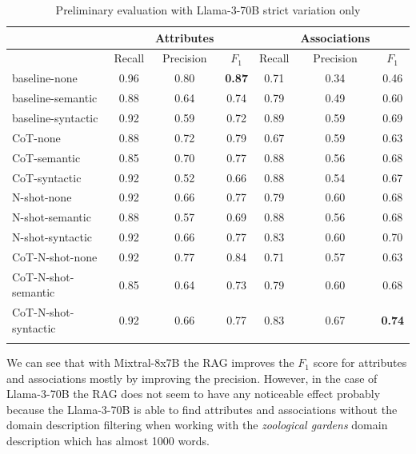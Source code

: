 \begin{table}[!h]
    \scriptsize
    \centering
    \setlength{\tabcolsep}{0.5em}
    \begin{tabular}{lcccccc}
    \toprule
         & & Attributes & & & Associations & \\
     \toprule
         & Recall & Precision & $F_1$ & Recall & Precision & $F_1$ \\
    \toprule
    
    \addlinespace
         baseline-none        & 0.96 & 0.80 & \textbf{0.87} & 0.71 & 0.34 & 0.46 \\
    	 baseline-semantic    & 0.88 & 0.64 & 0.74 & 0.79 & 0.49 & 0.60 \\
         baseline-syntactic   & 0.92 & 0.59 & 0.72 & 0.89 & 0.59 & 0.69 \\
         CoT-none             & 0.88 & 0.72 & 0.79 & 0.67 & 0.59 & 0.63 \\
         CoT-semantic         & 0.85 & 0.70 & 0.77 & 0.88 & 0.56 & 0.68 \\
         CoT-syntactic        & 0.92 & 0.52 & 0.66 & 0.88 & 0.54 & 0.67 \\
         N-shot-none          & 0.92 & 0.66 & 0.77 & 0.79 & 0.60 & 0.68 \\
         N-shot-semantic      & 0.88 & 0.57 & 0.69 & 0.88 & 0.56 & 0.68 \\
         N-shot-syntactic     & 0.92 & 0.66 & 0.77 & 0.83 & 0.60 & 0.70 \\
         CoT-N-shot-none      & 0.92 & 0.77 & 0.84 & 0.71 & 0.57 & 0.63 \\
         CoT-N-shot-semantic  & 0.85 & 0.64 & 0.73 & 0.79 & 0.60 & 0.68 \\
         CoT-N-shot-syntactic & 0.92 & 0.66 & 0.77 & 0.83 & 0.67 & \textbf{0.74} \\
    \addlinespace
    \bottomrule
    \addlinespace
    \end{tabular}
    \caption{Preliminary evaluation with Llama-3-70B strict variation only}
    \label{tab:preliminary-llama}
\end{table}

We can see that with Mixtral-8x7B the RAG improves the $F_1$ score for attributes and associations mostly by improving the precision. However, in the case of Llama-3-70B the RAG does not seem to have any noticeable effect probably because the Llama-3-70B is able to find attributes and associations without the domain description filtering when working with the \textit{zoological gardens} domain description which has almost 1000 words.

